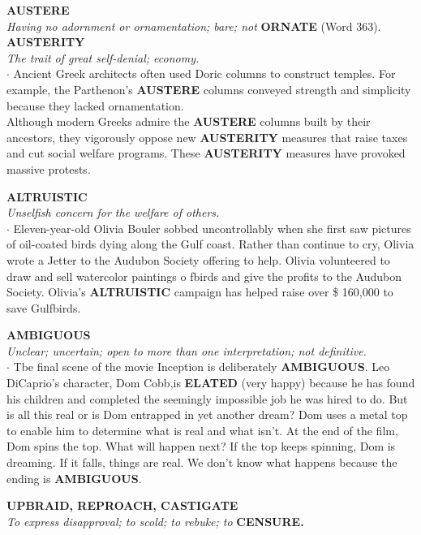 \documentclass{exam}
\begin{document}
\begin{questions}
\question \textbf{AUSTERE}\\
\textit{Having no adornment or ornamentation; bare;
not} \textbf{ORNATE} (Word 363).\\ \textbf{AUSTERITY}\\ \textit{The trait of great self-denial; economy.}\\

$ \cdot $ Ancient Greek architects often used Doric columns to construct temples. For example, the Parthenon's \textbf{AUSTERE} columns conveyed strength and simplicity because they lacked ornamentation.\\

Although modern Greeks admire the \textbf{AUSTERE}
columns built by their ancestors, they vigorously
oppose new \textbf{AUSTERITY} measures that raise taxes
and cut social welfare programs. These \textbf{AUSTERITY}
measures have provoked massive protests.

\question \textbf{ALTRUISTIC}\\\textit{Unselfish concern for the welfare of others.}\\

$ \cdot $ Eleven-year-old Olivia Bouler sobbed uncontrollably
when she first saw pictures of oil-coated birds dying
along the Gulf coast. Rather than continue to cry,
Olivia wrote a Jetter to the Audubon Society offering
to help. Olivia volunteered to draw and sell watercolor
paintings o fbirds and give the profits to the Audubon
Society. Olivia's \textbf{ALTRUISTIC} campaign has helped
raise over \$ 160,000 to save Gulfbirds.

\question \textbf{AMBIGUOUS}\\
\textit{Unclear; uncertain; open to more than one interpretation; not definitive.}\\

$ \cdot $ Tbe final scene of the movie Inception is deliberately \textbf{AMBIGUOUS}. Leo DiCaprio's character, Dom Cobb,is \textbf{ELATED} (very happy) because he has found his
children and completed the seemingly impossible job
he was hired to do. But is all this real or is Dom
entrapped in yet another dream? Dom uses a metal
top to enable him to determine what is real and what
isn't. At the end of the film, Dom spins the top. What
will happen next? If the top keeps spinning, Dom is
dreaming. If it falls, things are real. We don't know
what happens because the ending is \textbf{AMBIGUOUS}.

\question  \textbf{UPBRAID, REPROACH, CASTIGATE}\\ \textit{To express disapproval; to scold; to rebuke; to }\textbf{CENSURE.}\\


\end{questions}
\end{document}
